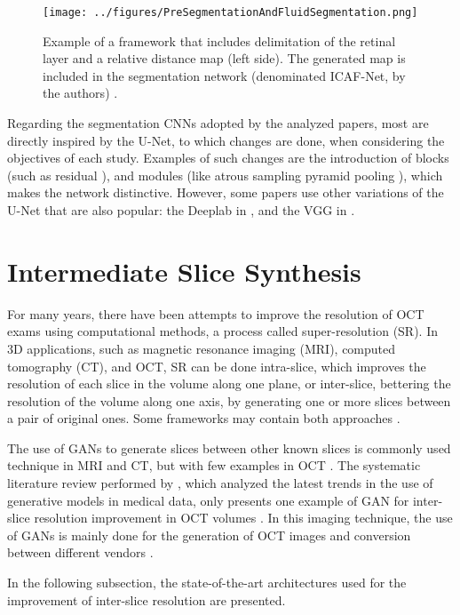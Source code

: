 \par
\begin{figure}[!ht]
	\centering
	\texttt{[image: ../figures/PreSegmentationAndFluidSegmentation.png]}
	\caption{Example of a framework that includes delimitation of the retinal layer and a relative distance map (left side). The generated map is included in the segmentation network (denominated ICAF-Net, by the authors) \parencite{Tang2022}.}
	\label{fig:PreSegmentationAndFluidSegmentation}
\end{figure}
\par
Regarding the segmentation CNNs adopted by the analyzed papers, most are directly inspired by the U-Net, to which changes are done, when considering the objectives of each study. Examples of such changes are the introduction of blocks (such as residual \parencite{Mantel2021, Zhang2023, Liu2024, Hassan2021b, Hassan2021a, Padilla2022}), and modules (like atrous sampling pyramid pooling \parencite{Hassan2021b, Hassan2021a, Hu2019, Sappa2021}), which makes the network distinctive. However, some papers use other variations of the U-Net that are also popular: the Deeplab \parencite{LChen2018} in \textcite{Hassan2021a, Li2023}, and the VGG \parencite{Simonyan2014} in \textcite{Padilla2022, Hassan2021b}.

\section{Intermediate Slice Synthesis}
For many years, there have been attempts to improve the resolution of OCT exams using computational methods, a process called super-resolution (SR). In 3D applications, such as magnetic resonance imaging (MRI), computed tomography (CT), and OCT, SR can be done intra-slice, which improves the resolution of each slice in the volume along one plane, or inter-slice, bettering the resolution of the volume along one axis, by generating one or more slices between a pair of original ones. Some frameworks may contain both approaches \parencite{You2020}.
\par
The use of GANs to generate slices between other known slices is commonly used technique in MRI and CT, but with few examples in OCT \parencite{You2020}. The systematic literature review performed by \textcite{Ibrahim2024}, which analyzed the latest trends in the use of generative models in medical data, only presents one example of GAN for inter-slice resolution improvement in OCT volumes \parencite{Lopez2023}. In this imaging technique, the use of GANs is mainly done for the generation of OCT images and conversion between different vendors \parencite{Ibrahim2024}.
\par
In the following subsection, the state-of-the-art architectures used for the improvement of inter-slice resolution are presented.

